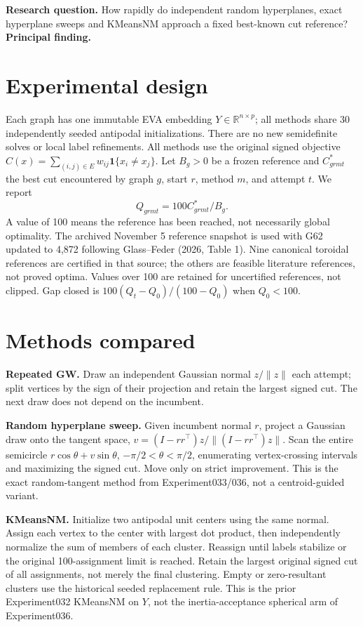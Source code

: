 \documentclass[11pt,a4paper]{article}
\begin{document}
\textbf{Research question.} How rapidly do independent random hyperplanes, exact hyperplane sweeps and KMeansNM approach a fixed best-known cut reference?
\textbf{Principal finding.} \PrincipalFinding

\section{Experimental design}
Each graph has one immutable EVA embedding $Y\in\mathbb R^{n\times p}$; all methods share 30 independently seeded antipodal initializations. There are no new semidefinite solves or local label refinements. All methods use the original signed objective $C(x)=\sum_{(i,j)\in E}w_{ij}\mathbf 1\{x_i\ne x_j\}$. Let $B_g>0$ be a frozen reference and $C^*_{grmt}$ the best cut encountered by graph $g$, start $r$, method $m$, and attempt $t$. We report
\[
 Q_{grmt}=100 C^*_{grmt}/B_g.
\]
A value of 100 means the reference has been reached, not necessarily global optimality. The archived November 5 reference snapshot is used with G62 updated to 4,872 following Glass--Feder (2026, Table 1). Nine canonical toroidal references are certified in that source; the others are feasible literature references, not proved optima. Values over 100 are retained for uncertified references, not clipped. Gap closed is $100(Q_t-Q_0)/(100-Q_0)$ when $Q_0<100$.

\section{Methods compared}
\textbf{Repeated GW.} Draw an independent Gaussian normal $z/\|z\|$ each attempt; split vertices by the sign of their projection and retain the largest signed cut. The next draw does not depend on the incumbent.

\textbf{Random hyperplane sweep.} Given incumbent normal $r$, project a Gaussian draw onto the tangent space, $v=(I-rr^\top)z/\|(I-rr^\top)z\|$. Scan the entire semicircle $r\cos\theta+v\sin\theta$, $-\pi/2<\theta<\pi/2$, enumerating vertex-crossing intervals and maximizing the signed cut. Move only on strict improvement. This is the exact random-tangent method from Experiment033/036, not a centroid-guided variant.

\textbf{KMeansNM.} Initialize two antipodal unit centers using the same normal. Assign each vertex to the center with largest dot product, then independently normalize the sum of members of each cluster. Reassign until labels stabilize or the original 100-assignment limit is reached. Retain the largest original signed cut of all assignments, not merely the final clustering. Empty or zero-resultant clusters use the historical seeded replacement rule. This is the prior Experiment032 KMeansNM on $Y$, not the inertia-acceptance spherical arm of Experiment036.
\end{document}
